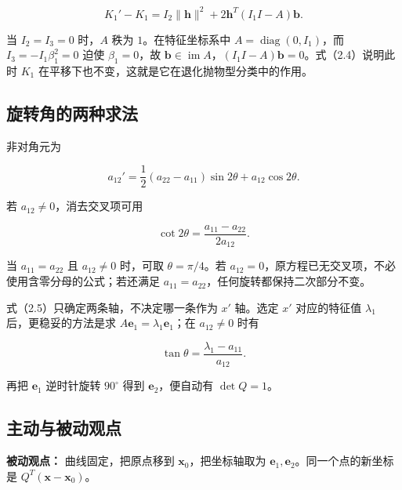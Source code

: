\documentclass[11pt,a4paper]{article}
\begin{document}
\begin{equation*}
K_1'-K_1=I_2\|\boldsymbol h\|^2+2\boldsymbol h^T(I_1I-A)\boldsymbol b.\tag{2.4}
\end{equation*}

当 \(I_2=I_3=0\) 时，\(A\) 秩为 \(1\)。在特征坐标系中
\(A=\operatorname{diag}(0,I_1)\)，而 \(I_3=-I_1\beta_1^2=0\) 迫使
\(\beta_1=0\)，故
\(\boldsymbol b\in\operatorname{im}A\)，\((I_1I-A)\boldsymbol b=0\)。式（2.4）说明此时
\(K_1\) 在平移下也不变，这就是它在退化抛物型分类中的作用。

\subsection{旋转角的两种求法}\label{ux65cbux8f6cux89d2ux7684ux4e24ux79cdux6c42ux6cd5}

非对角元为

\begin{equation*}
a_{12}'=\frac12(a_{22}-a_{11})\sin2\theta+a_{12}\cos2\theta.
\end{equation*}

若 \(a_{12}\ne0\)，消去交叉项可用

\begin{equation*}
\cot2\theta=\frac{a_{11}-a_{22}}{2a_{12}}.\tag{2.5}
\end{equation*}

当 \(a_{11}=a_{22}\) 且 \(a_{12}\ne0\) 时，可取 \(\theta=\pi/4\)。若
\(a_{12}=0\)，原方程已无交叉项，不必使用含零分母的公式；若还满足
\(a_{11}=a_{22}\)，任何旋转都保持二次部分不变。

式（2.5）只确定两条轴，不决定哪一条作为 \(x'\) 轴。选定 \(x'\)
对应的特征值 \(\lambda_1\) 后，更稳妥的方法是求
\(A\boldsymbol e_1=\lambda_1\boldsymbol e_1\)；在 \(a_{12}\ne0\) 时有

\begin{equation*}
\tan\theta=\frac{\lambda_1-a_{11}}{a_{12}}.\tag{2.6}
\end{equation*}

再把 \(\boldsymbol e_1\) 逆时针旋转 \(90^\circ\) 得到
\(\boldsymbol e_2\)，便自动有 \(\det Q=1\)。

\subsection{主动与被动观点}\label{ux4e3bux52a8ux4e0eux88abux52a8ux89c2ux70b9}

\textbf{被动观点：} 曲线固定，把原点移到
\(\boldsymbol x_0\)，把坐标轴取为
\(\boldsymbol e_1,\boldsymbol e_2\)。同一个点的新坐标是
\(Q^T(\boldsymbol x-\boldsymbol x_0)\)。
\end{document}
